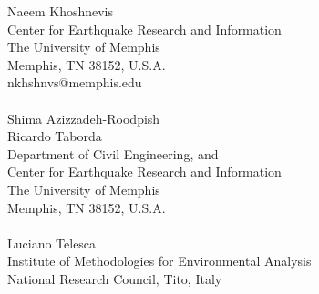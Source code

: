 Naeem Khoshnevis\\
Center for Earthquake Research and Information\\
The University of Memphis\\
Memphis, TN 38152, U.S.A.\\
nkhshnvs@memphis.edu\\
~\\
Shima Azizzadeh-Roodpish\\
Ricardo Taborda\\
Department of Civil Engineering, and\\
Center for Earthquake Research and Information\\
The University of Memphis\\
Memphis, TN 38152, U.S.A.\\
~\\
Luciano Telesca\\
Institute of Methodologies for Environmental Analysis\\
National Research Council, Tito, Italy\\